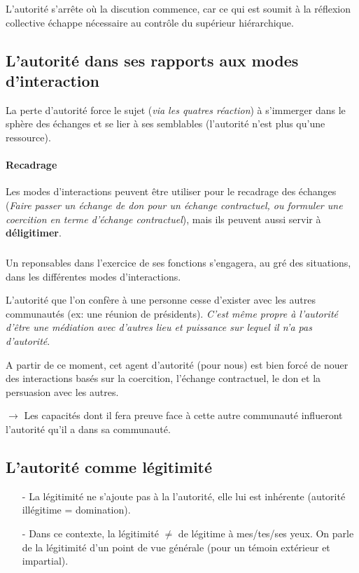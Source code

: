 \documentclass[11pt]{article} %
\begin{document}
L'autorité s'arrête où la discution commence, car ce qui est soumit à la
réflexion collective échappe nécessaire au contrôle du supérieur
hiérarchique.

\subsection{L'autorité dans ses rapports aux modes d'interaction}

La perte d'autorité force le sujet (\textit{via les quatres réaction})
à s'immerger dans le sphère des échanges et se lier à ses semblables
(l'autorité n'est plus qu'une ressource). 

\paragraph{Recadrage} Les modes d'interactions peuvent être utiliser
pour le recadrage des échanges (\textit{Faire passer un échange
de don pour un échange contractuel, ou formuler une coercition en
terme d'échange contractuel}), mais ils peuvent aussi servir à
\textbf{déligitimer}.


\subparagraph{ } Un reponsables dans l'exercice de ses fonctions
s'engagera, au gré des situations, dans les différentes modes
d'interactions.

L'autorité que l'on confère à une personne cesse d'exister avec les
autres communautés (ex: une réunion de présidents). \textit{C'est même
    propre à l'autorité d'être une médiation avec d'autres lieu et
puissance sur lequel il n'a pas d'autorité}.

A partir de ce moment, cet agent d'autorité (pour nous) est bien forcé
de nouer des interactions basés sur la coercition, l'échange
contractuel, le don et la persuasion avec les autres.

$\to$ Les capacités dont il fera preuve face à cette autre communauté
influeront l'autorité qu'il a dans sa communauté.

\subsection{L'autorité comme légitimité}

\begin{itemize}
    \item[-] La légitimité ne s'ajoute pas à la l'autorité, elle lui est
inhérente (autorité illégitime = domination). 

\item[-] Dans ce contexte, la légitimité $\neq$ de légitime à mes/tes/ses
yeux. On parle de la légitimité d'un point de vue générale (pour un
témoin extérieur et impartial).
\end{itemize}
\end{document}
